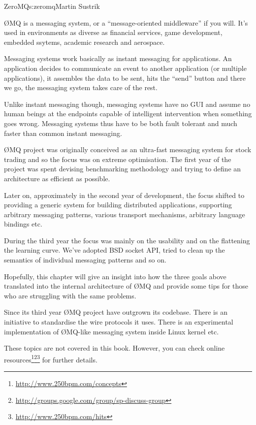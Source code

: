 \begin{aosachapter}{ZeroMQ}{s:zeromq}{Martin Sustrik}


{\O}MQ is a messaging system, or a ``message-oriented middleware'' if you
will. It's used in environments as diverse as financial services, game
development, embedded ssytems, academic research and aerospace.

Messaging systems work basically as instant messaging for
applications. An application decides to communicate an event to
another application (or multiple applications), it assembles the data
to be sent, hits the ``send'' button and there we go, the messaging
system takes care of the rest.

Unlike instant messaging though, messaging systems have no GUI and
assume no human beings at the endpoints capable of intelligent
intervention when something goes wrong. Messaging systems thus have to
be both fault tolerant and much faster than common instant messaging.

{\O}MQ project was originally conceived as an ultra-fast messaging system
for stock trading and so the focus was on extreme optimisation. The
first year of the project was spent devising benchmarking methodology
and trying to define an architecture as efficient as possible.

Later on, approximately in the second year of development, the focus
shifted to providing a generic system for building distributed
applications, supporting arbitrary messaging patterns, various
transport mechanisms, arbitrary language bindings etc.

During the third year the focus was mainly on the usability and on the
flattening the learning curve. We've adopted BSD socket API, tried to
clean up the semantics of individual messaging patterns and so on.

Hopefully, this chapter will give an insight into how the three goals
above translated into the internal architecture of {\O}MQ and provide
some tips for those who are struggling with the same problems.

Since its third year {\O}MQ project have outgrown its codebase. There is
an initiative to standardise the wire protocols it uses. There is an
experimental implementation of {\O}MQ-like messaging system inside Linux
kernel etc.

These topics are not covered in this book. However, you can check
online
resources\footnote{\url{http://www.250bpm.com/concepts}}\footnote{\url{http://groups.google.com/group/sp-discuss-group}}\footnote{\url{http://www.250bpm.com/hits}}
for further details.


\end{aosachapter}
